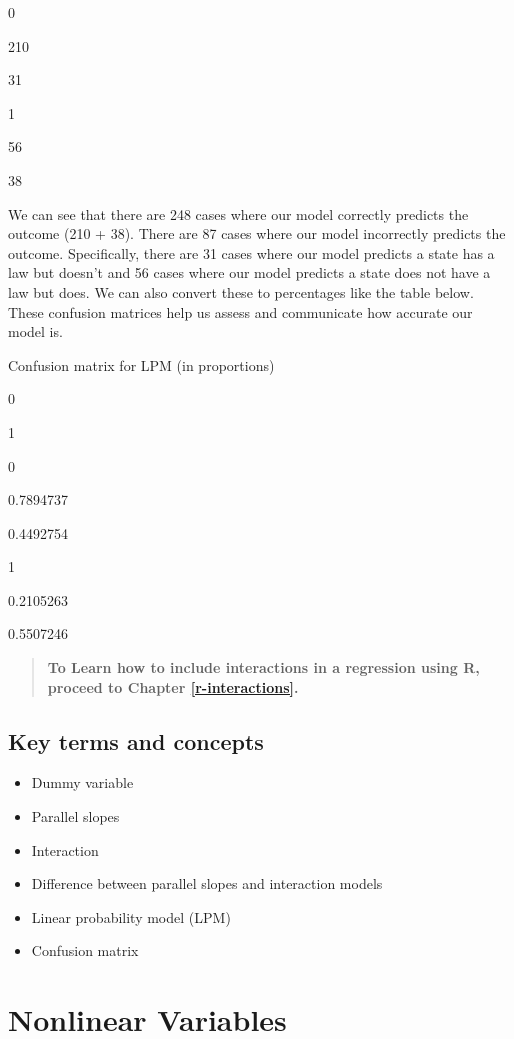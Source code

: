 \documentclass[
]{book}
\providecommand{\tightlist}{%
  \setlength{\itemsep}{0pt}\setlength{\parskip}{0pt}}
\newenvironment{learncheck}%
{%
  \par\vspace{\baselineskip}\noindent 
  \color{Exercise}\begin{itshape}%
  \par\vspace{\baselineskip}\noindent\ignorespaces 
}%
{%
  \end{itshape}\ignorespacesafterend 
}
\begin{document}
0

210

31

1

56

38

We can see that there are 248 cases where our model correctly predicts the outcome (210 + 38). There are 87 cases where our model incorrectly predicts the outcome. Specifically, there are 31 cases where our model predicts a state has a law but doesn't and 56 cases where our model predicts a state does not have a law but does. We can also convert these to percentages like the table below. These confusion matrices help us assess and communicate how accurate our model is.

\label{tab:unnamed-chunk-49}Confusion matrix for LPM (in proportions)

0

1

0

0.7894737

0.4492754

1

0.2105263

0.5507246

\begin{quote}
\textbf{To Learn how to include interactions in a regression using R, proceed to Chapter \ref{r-interactions}.}
\end{quote}

\hypertarget{kt7}{%
\section{Key terms and concepts}\label{kt7}}

\begin{learncheck}
\begin{itemize}
\tightlist
\item
  Dummy variable
\item
  Parallel slopes
\item
  Interaction
\item
  Difference between parallel slopes and interaction models
\item
  Linear probability model (LPM)
\item
  Confusion matrix
\end{itemize}
\end{learncheck}

\hypertarget{nonlinear-variables}{%
\chapter{Nonlinear Variables}\label{nonlinear-variables}}
\end{document}
